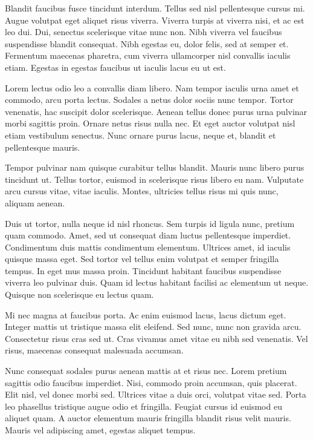 \documentclass[
]{HyperedReport}
\begin{document}
\begin{fullwidth} %
	\begin{multicols}{2} %
		Blandit faucibus fusce tincidunt interdum. Tellus sed nisl pellentesque cursus mi. Augue volutpat eget aliquet risus viverra. Viverra turpis at viverra nisi, et ac est leo dui. Dui, senectus scelerisque vitae nunc non. Nibh viverra vel faucibus suspendisse blandit consequat. Nibh egestas eu, dolor felis, sed at semper et. Fermentum maecenas pharetra, cum viverra ullamcorper nisl convallis iaculis etiam. Egestas in egestas faucibus ut iaculis lacus eu ut est.
		
		Lorem lectus odio leo a convallis diam libero. Nam tempor iaculis urna amet et commodo, arcu porta lectus. Sodales a netus dolor sociis nunc tempor. Tortor venenatis, hac suscipit dolor scelerisque. Aenean tellus donec purus urna pulvinar morbi sagittis proin. Ornare netus risus nulla nec. Et eget auctor volutpat nisl etiam vestibulum senectus. Nunc ornare purus lacus, neque et, blandit et pellentesque mauris.
		
		Tempor pulvinar nam quisque curabitur tellus blandit. Mauris nunc libero purus tincidunt ut. Tellus tortor, euismod in scelerisque risus libero eu nam. Vulputate arcu cursus vitae, vitae iaculis. Montes, ultricies tellus risus mi quis nunc, aliquam aenean.
		
		\columnbreak %
		
		Duis ut tortor, nulla neque id nisl rhoncus. Sem turpis id ligula nunc, pretium quam commodo. Amet, sed ut consequat diam luctus pellentesque imperdiet. Condimentum duis mattis condimentum elementum. Ultrices amet, id iaculis quisque massa eget. Sed tortor vel tellus enim volutpat et semper fringilla tempus. In eget mus massa proin. Tincidunt habitant faucibus suspendisse viverra leo pulvinar duis. Quam id lectus habitant facilisi ac elementum ut neque. Quisque non scelerisque eu lectus quam.
		
		Mi nec magna at faucibus porta. Ac enim euismod lacus, lacus dictum eget. Integer mattis ut tristique massa elit eleifend. Sed nunc, nunc non gravida arcu. Consectetur risus cras sed ut. Cras vivamus amet vitae eu nibh sed venenatis. Vel risus, maecenas consequat malesuada accumsan.
		
	Nunc consequat sodales purus aenean mattis at et risus nec. Lorem pretium sagittis odio faucibus imperdiet. Nisi, commodo proin accumsan, quis placerat. Elit nisl, vel donec morbi sed. Ultrices vitae a duis orci, volutpat vitae sed. Porta leo phasellus tristique augue odio et fringilla. Feugiat cursus id euismod eu aliquet quam. A auctor elementum mauris fringilla blandit risus velit mauris. Mauris vel adipiscing amet, egestas aliquet tempus.
	\end{multicols}
\end{fullwidth}
\end{document}

